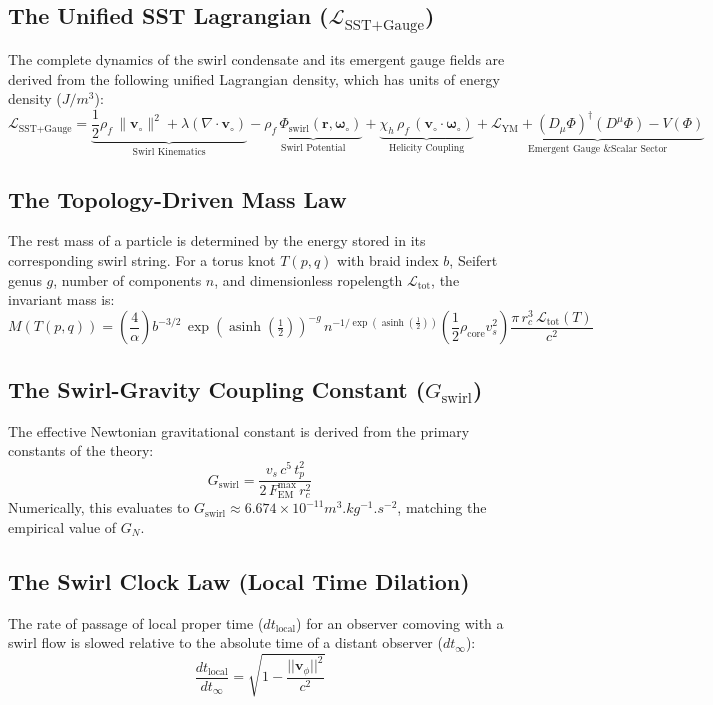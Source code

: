 \documentclass[11pt]{article}
\newcommand{\vswirl}{\mathbf{v}_{\circ}}
\newcommand{\omegas}{\boldsymbol{\omega}_{\circ}}
\newcommand{\rc}{r_c}
\newcommand{\rhof}{\rho_{\!f}}
\newcommand{\rhocore}{\rho_{\mathrm{core}}}
\newcommand{\FmaxEM}{F_{\mathrm{EM}}^{\max}}
\newcommand{\vscore}{v_{s}}
\newcommand{\xig}{\operatorname{asinh}\!\left(\tfrac{1}{2}\right)}
\newcommand{\phig}{\exp(\xig)}
\begin{document}
\subsection{The Unified SST Lagrangian ($\mathcal{L}_{\text{SST+Gauge}}$)}
    The complete dynamics of the swirl condensate and its emergent gauge fields are derived from the following unified Lagrangian density, which has units of energy density ($J/m^3$):
    \begin{equation}
    \boxed{
        \mathcal{L}_{\text{SST+Gauge}} = \underbrace{\frac{1}{2}\rhof\,\|\vswirl\|^2 + \lambda(\nabla\cdot\vswirl)}_{\text{Swirl Kinematics}} - \underbrace{\rhof\,\Phi_{\text{swirl}}(\mathbf{r},\omegas)}_{\text{Swirl Potential}} + \underbrace{\chi_h\,\rhof\,(\vswirl\cdot\omegas)}_{\text{Helicity Coupling}} + \underbrace{\mathcal{L}_{\text{YM}} + (D_\mu\Phi)^\dagger (D^\mu\Phi) - V(\Phi)}_{\text{Emergent Gauge \& Scalar Sector}}
    }
    \end{equation}

\subsection{The Topology-Driven Mass Law}
    The rest mass of a particle is determined by the energy stored in its corresponding swirl string. For a torus knot $T(p,q)$ with braid index $b$, Seifert genus $g$, number of components $n$, and dimensionless ropelength $\mathcal{L}_{\text{tot}}$, the invariant mass is:
    \begin{equation}
    \boxed{
        M(T(p,q)) = \left(\frac{4}{\alpha}\right) b^{-3/2}\,\phig^{-g}\,n^{-1/\phig} \left(\frac{1}{2}\rhocore\vscore^2\right) \frac{\pi\,\rc^3\,\mathcal{L}_{\text{tot}}(T)}{c^2}
    }
    \end{equation}

\subsection{The Swirl-Gravity Coupling Constant ($G_{\text{swirl}}$)}
    The effective Newtonian gravitational constant is derived from the primary constants of the theory:
    \begin{equation}
    \boxed{
        G_{\text{swirl}} = \frac{\vscore\,c^5\,t_p^2}{2\,\FmaxEM\,\rc^2}
    }
    \end{equation}
    Numerically, this evaluates to $G_{\text{swirl}} \approx 6.674 \times 10^{-11} \si{m^3.kg^{-1}.s^{-2}}$, matching the empirical value of $G_N$.

\subsection{The Swirl Clock Law (Local Time Dilation)}
    The rate of passage of local proper time ($dt_{\text{local}}$) for an observer comoving with a swirl flow is slowed relative to the absolute time of a distant observer ($dt_{\infty}$):
    \begin{equation}
    \boxed{
        \frac{dt_{\text{local}}}{dt_{\infty}} = \sqrt{1-\frac{||\mathbf{v}_{\phi}||^{2}}{c^{2}}}
    }
    \end{equation}
\end{document}
